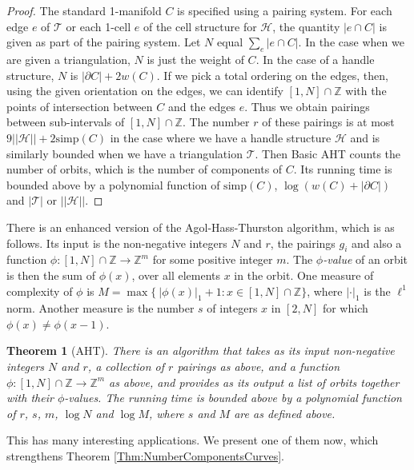 \documentclass[oneside]{amsart}
\numberwithin{equation}{section}
\theoremstyle{plain}
\newtheorem{theorem}[equation]{Theorem}
\theoremstyle{definition}
\newcommand{\calT}{{\mathcal{T}}}
\newcommand{\calH}{\mathcal{H}}
\begin{document}
\begin{proof} 
The standard 1-manifold $C$ is specified using a pairing system. For each edge $e$ of $\calT$ or each 1-cell $e$ of the cell structure for $\calH$, the quantity $|e \cap C|$ is given as part of the pairing system. Let $N$ equal $\sum_e |e \cap C|$. In the case when we are given a triangulation, $N$ is just the weight of $C$. In the case of a handle structure, $N$ is $|\partial C| + 2 w(C)$. If we pick a total ordering on the edges, then, using the given orientation on the edges, we can identify $[1,N] \cap \mathbb{Z}$ with the points of intersection between $C$ and the edges $e$. Thus we obtain pairings between sub-intervals of $[1,N] \cap \mathbb{Z}$. The number $r$ of these pairings is at most $9||\calH|| + 2 \mathrm{simp}(C)$ in the case where we have a handle structure $\calH$ and is similarly bounded when we have a triangulation $\calT$. Then {\sc Basic AHT} counts the number of orbits, which is the number of components of $C$. Its running time is bounded above by a polynomial function of $\mathrm{simp}(C)$, $\log (w(C) + |\partial C|)$ and $|\calT|$ or $||\calH||$.
\end{proof}

There is an enhanced version of the Agol-Hass-Thurston algorithm, which is as follows. Its input is the non-negative integers $N$ and $r$, the pairings $g_i$ and also a function $\phi \colon [1,N] \cap \mathbb{Z} \rightarrow \mathbb{Z}^m$ for some positive integer $m$. The \emph{$\phi$-value} of an orbit is then the sum of $\phi(x)$, over all elements $x$ in the orbit. One measure of complexity of $\phi$ is $M = \max \{\ |\phi(x)|_1+1 : x \in [1,N] \cap \mathbb{Z} \}$, where $| \cdot |_1$ is the $\ell^1$ norm. Another measure is the number $s$ of integers $x$ in $[2,N]$ for which $\phi(x) \not= \phi(x-1)$. 

\begin{theorem}[{\sc AHT}]
There is an algorithm that takes as its input non-negative integers $N$ and $r$, a collection of $r$ pairings as above, and a function $\phi \colon [1,N] \cap \mathbb{Z} \rightarrow \mathbb{Z}^m$ as above, and provides as its output a list of orbits together with their $\phi$-values. The running time is bounded above by a polynomial function of $r$, $s$, $m$, $\log N$ and $\log M$, where $s$ and $M$ are as defined above.
\end{theorem}

This has many interesting applications. We present one of them now, which strengthens Theorem \ref{Thm:NumberComponentsCurves}.
\end{document}
